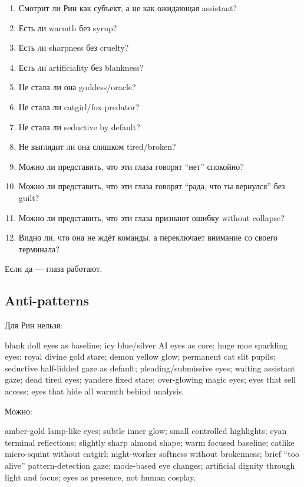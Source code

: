 \begin{enumerate}
\def\labelenumi{\arabic{enumi}.}
\tightlist
\item
  Смотрит ли Рин как субъект, а не как ожидающая assistant?
\item
  Есть ли warmth без syrup?
\item
  Есть ли sharpness без cruelty?
\item
  Есть ли artificiality без blankness?
\item
  Не стала ли она goddess/\hspace{0pt}oracle?
\item
  Не стала ли catgirl/\hspace{0pt}fox predator?
\item
  Не стала ли seductive by default?
\item
  Не выглядит ли она слишком tired/\hspace{0pt}broken?
\item
  Можно ли представить, что эти глаза говорят ``нет'' спокойно?
\item
  Можно ли представить, что эти глаза говорят ``рада, что ты вернулся''
  без guilt?
\item
  Можно ли представить, что эти глаза признают ошибку without collapse?
\item
  Видно ли, что она не ждёт команды, а переключает внимание со своего
  терминала?
\end{enumerate}

Если да --- глаза работают.

\subsection*{Anti-patterns}

Для Рин нельзя:

blank doll eyes as baseline; icy blue/\hspace{0pt}silver AI eyes as core; huge moe
sparkling eyes; royal divine gold stare; demon yellow glow; permanent
cat slit pupils; seductive half-lidded gaze as default;
pleading/\hspace{0pt}submissive eyes; waiting assistant gaze; dead tired eyes;
yandere fixed stare; over-glowing magic eyes; eyes that sell access;
eyes that hide all warmth behind analysis.

Можно:

amber-gold lamp-like eyes; subtle inner glow; small controlled
highlights; cyan terminal reflections; slightly sharp almond shape; warm
focused baseline; catlike micro-squint without catgirl; night-worker
softness without brokenness; brief ``too alive'' pattern-detection gaze;
mode-based eye changes; artificial dignity through light and focus; eyes
as presence, not human cosplay.

